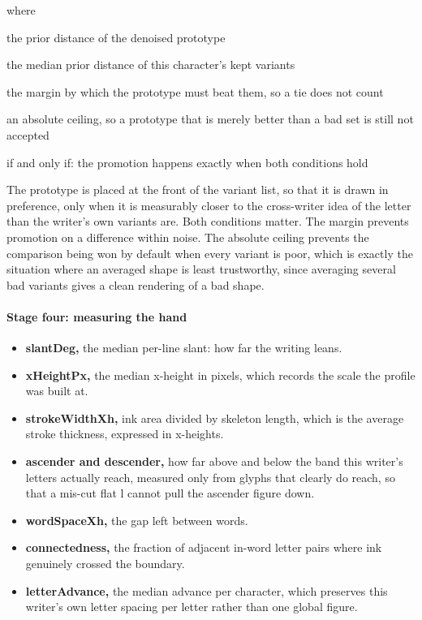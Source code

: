 \noindent where
\begin{description}[leftmargin=2.4em,style=nextline,font=\normalfont\ttfamily]\setlength\itemsep{1pt}
  \item[{$D_{\mathrm{proto}}$}] \normalfont the prior distance of the denoised prototype
  \item[{$D_{\mathrm{raw}}$}] \normalfont the median prior distance of this character's kept variants
  \item[{$0.02$}] \normalfont the margin by which the prototype must beat them, so a tie does not count
  \item[{$0.32$}] \normalfont an absolute ceiling, so a prototype that is merely better than a bad set is still not accepted
  \item[{$\Longleftrightarrow$}] \normalfont if and only if: the promotion happens exactly when both conditions hold
\end{description}
The prototype is placed at the front of the variant list, so that it is drawn in preference, only when it is measurably closer to the cross-writer idea of the letter than the writer's own variants are. Both conditions matter. The margin prevents promotion on a difference within noise. The absolute ceiling prevents the comparison being won by default when every variant is poor, which is exactly the situation where an averaged shape is least trustworthy, since averaging several bad variants gives a clean rendering of a bad shape.


\paragraph{Stage four: measuring the hand}

\begin{itemize}\setlength\itemsep{0pt}
  \item \textbf{slantDeg,} the median per-line slant: how far the writing leans.
  \item \textbf{xHeightPx,} the median x-height in pixels, which records the scale the profile was built at.
  \item \textbf{strokeWidthXh,} ink area divided by skeleton length, which is the average stroke thickness, expressed in x-heights.
  \item \textbf{ascender and descender,} how far above and below the band this writer's letters actually reach, measured only from glyphs that clearly do reach, so that a mis-cut flat l cannot pull the ascender figure down.
  \item \textbf{wordSpaceXh,} the gap left between words.
  \item \textbf{connectedness,} the fraction of adjacent in-word letter pairs where ink genuinely crossed the boundary.
  \item \textbf{letterAdvance,} the median advance per character, which preserves this writer's own letter spacing per letter rather than one global figure.
\end{itemize}

